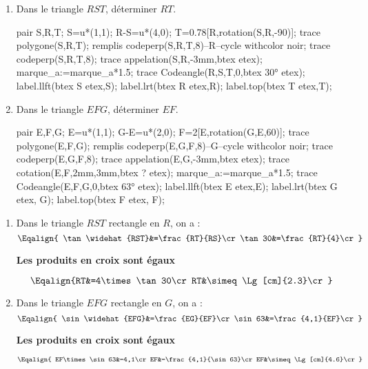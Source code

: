 \begin{methode}
    \exercice
    \begin{enumerate}    
        \item Dans le triangle $RST$, déterminer $RT$.\\
        \begin{Geometrie}[CoinHD={(6u,4.5u)}]        
            pair S,R,T;
            S=u*(1,1);
            R-S=u*(4,0);
            T=0.78[R,rotation(S,R,-90)];
            trace polygone(S,R,T);
            remplis codeperp(S,R,T,8)--R--cycle withcolor noir;
            trace codeperp(S,R,T,8);
            trace appelation(S,R,-3mm,btex  etex);             
            marque_a:=marque_a*1.5;
            trace Codeangle(R,S,T,0,btex \ang{30} etex);
            label.llft(btex S etex,S);
            label.lrt(btex R etex,R);
            label.top(btex T etex,T);
        \end{Geometrie}
        \item Dans le triangle $EFG$, déterminer $EF$.\\
        \begin{Geometrie}[CoinHD={(4u,5u)}]        
            pair E,F,G;
            E=u*(1,1);
            G-E=u*(2,0);
            F=2[E,rotation(G,E,60)];
            trace polygone(E,F,G);
            remplis codeperp(E,G,F,8)--G--cycle withcolor noir;
            trace codeperp(E,G,F,8);
            trace appelation(E,G,-3mm,btex  etex);        
            trace cotation(E,F,2mm,3mm,btex ? etex);
            marque_a:=marque_a*1.5;
            trace Codeangle(E,F,G,0,btex \ang{63} etex);
            label.llft(btex E etex,E);
            label.lrt(btex G etex, G);
            label.top(btex F etex, F);
        \end{Geometrie}
    \end{enumerate}
    \correction
    \begin{enumerate}
        \item Dans le triangle $RST$ rectangle en $R$, on a : 
        $$\Eqalign{
        \tan\widehat{RST}&=\frac{RT}{RS}\cr
        \tan30&=\frac{RT}{4}\cr
        }$$
        \begin{center}
            {\bf Les produits en croix sont égaux}
        \end{center}
        $$\Eqalign{RT&=4\times\tan30\cr
        RT&\simeq \Lg[cm]{2.3}\cr
        }$$
        \item Dans le triangle $EFG$ rectangle en $G$, on a :
        $$\Eqalign{
        \sin\widehat{EFG}&=\frac{EG}{EF}\cr
        \sin63&=\frac{4,1}{EF}\cr
        }$$
        \begin{center}
        {\bf Les produits en croix sont égaux}
        \end{center}
        $$\Eqalign{
        EF\times\sin63&=4,1\cr
        EF&=\frac{4,1}{\sin63}\cr
        EF&\simeq\Lg[cm]{4.6}\cr
        }$$
    \end{enumerate}
\end{methode}

